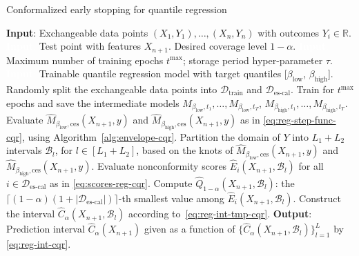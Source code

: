 \begin{algorithm}[H]
    \caption{Conformalized early stopping for quantile regression}
    \label{alg:reg-cqr}
    \begin{algorithmic}[1]
        \STATE \textbf{Input}: Exchangeable data points $(X_{1},Y_{1}), \ldots, (X_{n},Y_{n})$ with outcomes $Y_i \in \mathbb{R}$.
        \STATE \textcolor{white}{\textbf{Input}:} Test point with features $X_{n+1}$. Desired coverage level $1-\alpha$.
        \STATE \textcolor{white}{\textbf{Input}:} Maximum number of training epochs $t^{\text{max}}$; storage period hyper-parameter $\tau$.
        \STATE \textcolor{white}{\textbf{Input}:} Trainable quantile regression model with target quantiles [$\beta_{\text{low}}$, $\beta_{\text{high}}$].
        \STATE Randomly split the exchangeable data points into $\mathcal{D}_{\text{train}}$ and $\mathcal{D}_{\text{es-cal}}$.
        \STATE Train for $t^{\text{max}}$ epochs and save the intermediate models $M_{\beta_{\text{low}}, t_1} , \dots, M_{\beta_{\text{low}}, t_T}$, $M_{\beta_{\text{high}}, t_1} , \dots, M_{\beta_{\text{high}}, t_T}$.
        \STATE Evaluate $\hat{M}_{\beta_{\text{low}},\text{ces}}(X_{n+1},y)$ and $\hat{M}_{\beta_{\text{high}},\text{ces}}(X_{n+1},y)$ as in \eqref{eq:reg-step-func-cqr}, using Algorithm~\ref{alg:envelope-cqr}.
        \STATE Partition the domain of $Y$ into $L_1+L_2$ intervals $\mathcal{B}_l$, for $l \in [L_1+L_2]$, based on the knots of $\hat{M}_{\beta_{\text{low}},\text{ces}}(X_{n+1},y)$ and $\hat{M}_{\beta_{\text{high}},\text{ces}}(X_{n+1},y)$.
        \STATE Evaluate nonconformity scores $\hat{E}_i(X_{n+1},\mathcal{B}_l)$ for all $i \in \mathcal{D}_{\text{es-cal}}$ as in \eqref{eq:scores-reg-cqr}.
        \STATE Compute $\hat{Q}_{1-\alpha}(X_{n+1},\mathcal{B}_l)$: the $\lceil (1-\alpha)(1+|\mathcal{D}_{\text{es-cal}}|) \rceil$-th smallest value among $\hat{E}_i(X_{n+1},\mathcal{B}_l)$.
 \STATE Construct the interval $\hat{C}_{\alpha}(X_{n+1}, \mathcal{B}_l)$ according to~\eqref{eq:reg-int-tmp-cqr}.
        \ENDFOR
        \STATE \textbf{Output}: Prediction interval $\hat{C}_{\alpha}(X_{n+1})$ given as a function of $\{\hat{C}_{\alpha}(X_{n+1}, \mathcal{B}_l)\}_{l=1}^{L}$ by \eqref{eq:reg-int-cqr}.
    \end{algorithmic}
\end{algorithm}


